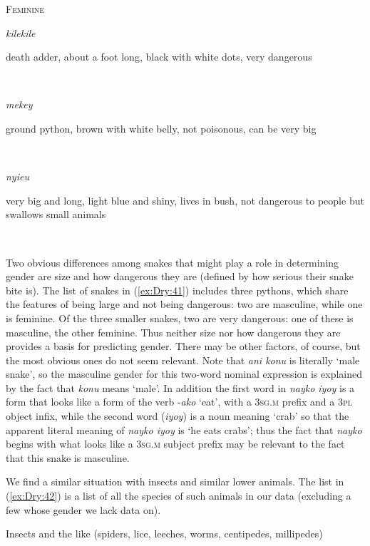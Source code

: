 \documentclass[output=collectionpaper]{langsci/langscibook}
\begin{document}
\textsc{Feminine}\\
\smallskip\parbox[t]{20mm}{\textit{kilekile}}\parbox[t]{90mm}{death adder, about a foot long, black with white dots, very dangerous}\\
\smallskip\parbox[t]{20mm}{\textit{mekey}}\parbox[t]{90mm}{ground python, brown with white belly, not poisonous, can be very big}\\
\smallskip\parbox[t]{20mm}{\textit{nyieu}}\parbox[t]{90mm}{very big and long, light blue and shiny, lives in bush, not dangerous to people but swallows small animals}\\
\z

Two obvious differences among snakes that might play a role in determining gender are size and how dangerous they are (defined by how serious their snake bite is). The list of snakes in (\ref{ex:Dry:41}) includes three pythons, which share the features of being large and not being dangerous: two are masculine, while one is feminine. Of the three smaller snakes, two are very dangerous: one of these is masculine, the other feminine. Thus neither size nor how dangerous they are provides a basis for predicting gender. There may be other factors, of course, but the most obvious ones do not seem relevant. Note that \textit{ani konu} is literally `male snake', so the masculine gender for this two-word nominal expression is explained by the fact that \textit{konu} means `male'. In addition the first word in \textit{nayko iyoy} is a form that looks like a form of the verb -\textit{ako} `eat', with a \textsc{3sg.m} prefix and a \textsc{3pl} object infix, while the second word (\textit{iyoy}) is a noun meaning `crab' so that the apparent literal meaning of \textit{nayko iyoy} is `he eats crabs'; thus the fact that \textit{nayko} begins with what looks like a \textsc{3sg.m} subject prefix may be relevant to the fact that this snake is masculine.

We find a similar situation with insects and similar lower animals. The list in (\ref{ex:Dry:42}) is a list of all the species of such animals in our data (excluding a few whose gender we lack data on).

\ea    \label{ex:Dry:42}
Insects and the like (spiders, lice, leeches, worms, centipedes, millipedes)\\ 
\end{document}
